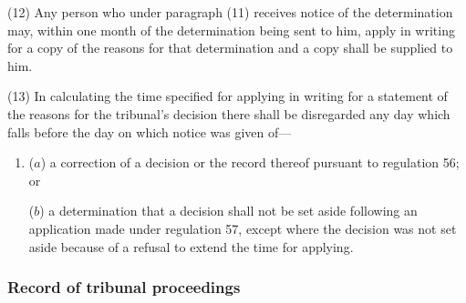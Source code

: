\documentclass[12pt,a4paper]{article}
\begin{document}
(12) Any person who under paragraph (11) receives 
notice  %
of the 
determination  %
may, within one month of the 
determination  %
being sent to him, apply in writing for a copy of the reasons for that 
determination  %
and a copy shall be supplied to him.

%

(13) In calculating the time specified for applying in writing for a statement of the reasons for the tribunal’s decision there shall be disregarded any day which falls before the day on which notice was given of—
\begin{enumerate}\item[]
($a$) a correction of a decision or the record thereof pursuant to regulation 56; or

($b$) a determination that a decision shall not be set aside following an application made under regulation 57, except where the decision was not set aside because of a refusal to extend the time for applying.
\end{enumerate}


\subsubsection[55. Record of tribunal proceedings]{Record of tribunal proceedings}
\end{document}
